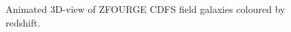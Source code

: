 \begin{figure}[t!]
    \setlength{\abovecaptionskip}{60pt} %
    \caption{Animated 3D-view of ZFOURGE CDFS field galaxies coloured by redshift.}
    \setlength{\abovecaptionskip}{10pt} %
\end{figure}